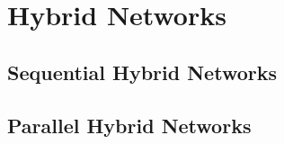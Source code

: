 \section{Hybrid Networks}


\subsection{Sequential Hybrid Networks}

\subsection{Parallel Hybrid Networks}

